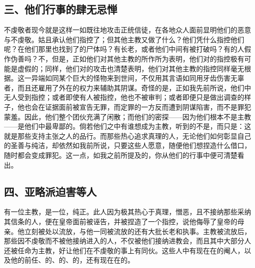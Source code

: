 \subsection{三、他们行事的肆无忌惮}

不虔敬者现今就是这样一如既往地攻击正统信徒，在各地众人面前显明他们的恶意与不虔敬。姑且承认他们指控了；但其他主教又做了什么？他们凭什么指控他们呢？在他们那里也找到了的尸体吗？有长老，或者他们中间有被打破吗？有的人假作伪善吗？不，但是，正如他们对其他主教的所作所为表明，他们对的指控极有可能是虚假的；同样，他们对的攻击也清楚表明，他们对其他主教的指控同样毫无根据。这一异端如同某个巨大的怪物来到世间，不仅用其言语如同用牙齿伤害无辜者，而且还雇用了外在的权力来辅助其阴谋。奇怪的是，正如我先前所说，他们中无人受到指控；或者即使有人被指控，他也不被审判；或者即便只是做出调查的样子，他也会在证据面前被宣告无罪，而定罪的一方反而遭到阴谋陷害，而不是罪犯蒙羞。因此，他们整个团伙充满了闲散；而他们的密探——因为他们根本不是主教——是他们中最卑鄙的。倘若他们之中有谁想成为主教，听到的不是，而只是：这就是那些支持主张之人的品行。而那些热心追求真理的人，无论他们如何彰显自己的圣善与纯洁，却依然如我前所说，只要这些人愿意，随便他们想捏造什么借口，随时都会变成罪犯。这一点，如我之前所提及的，你从他们的行事中便可清楚看出。\par


\subsection{四、亚略派迫害等人}

有一位主教，是一位，纯正。此人因为极其热心于真理，憎恶，且不接纳那些采纳其信条的人，便在皇帝面前被诬告，并被捏造了一个指控，说他侮辱了皇帝的母亲。他立刻被处以流放，与他一同被流放的还有大批长老和执事。主教被流放后，那些因不虔敬而不被他接纳进入的人，不仅被他们接纳进教会，而且其中大部分人还被任命为主教，好让他们在不虔敬的事上有同伙。这些人中有现在在的阉人，以及他的前任、的、的、的，还有现在在的。\par

